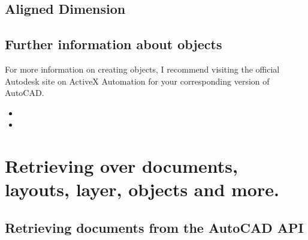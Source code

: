 \documentclass[a4paper,10pt,english]{sphinxmanual}
\begin{document}
\subsection{Aligned Dimension}
\label{\detokenize{usage:aligned-dimension}}
\begin{sphinxVerbatim}[commandchars=\\\{\}]
         
  
\end{sphinxVerbatim}


\subsection{Further information about objects}
\label{\detokenize{usage:further-information-about-objects}}
\sphinxAtStartPar
For more information on creating objects, I recommend visiting the official Autodesk site on ActiveX Automation for your corresponding version of AutoCAD.
\begin{itemize}
\item {} 
\sphinxAtStartPar
{}

\item {} 
\sphinxAtStartPar
{}

\end{itemize}


\section{Retrieving over documents, layouts, layer, objects and more.}
\label{\detokenize{usage:retrieving-over-documents-layouts-layer-objects-and-more}}

\subsection{Retrieving documents from the AutoCAD API}
\label{\detokenize{usage:retrieving-documents-from-the-autocad-api}}
\begin{sphinxVerbatim}[commandchars=\\\{\}]
\end{sphinxVerbatim}
\end{document}
